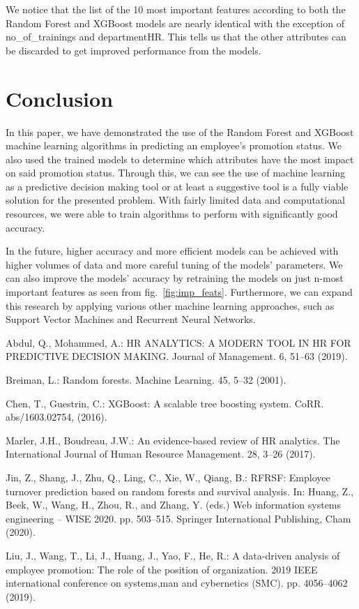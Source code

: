 \documentclass[runningheads]{llncs}
\begin{document}
\newpage

We notice that the list of the 10 most important features according to
both the Random Forest and XGBoost models are nearly identical with the
exception of no\_of\_trainings and departmentHR. This tells us that the
other attributes can be discarded to get improved performance from the
models.

\hypertarget{conclusion}{%
\section{Conclusion}\label{conclusion}}

In this paper, we have demonstrated the use of the Random Forest and
XGBoost machine learning algorithms in predicting an employee's
promotion status. We also used the trained models to determine which
attributes have the most impact on said promotion status. Through this,
we can see the use of machine learning as a predictive decision making
tool or at least a suggestive tool is a fully viable solution for the
presented problem. With fairly limited data and computational resources,
we were able to train algorithms to perform with significantly good
accuracy.

In the future, higher accuracy and more efficient models can be achieved
with higher volumes of data and more careful tuning of the models'
parameters. We can also improve the models' accuracy by retraining the
models on just n-most important features as seen from
fig.~\ref{fig:imp_feats}. Furthermore, we can expand this research by
applying various other machine learning approaches, such as Support
Vector Machines and Recurrent Neural Networks.

\begin{thebibliography}{8}
%
{Abdul, Q., Mohammed, A.: HR ANALYTICS: A MODERN TOOL IN
HR FOR PREDICTIVE DECISION MAKING. Journal of Management. 6, 51--63
(2019).}

%
{Breiman, L.: Random forests. Machine Learning. 45, 5--32
(2001).}

%
{Chen, T., Guestrin, C.: XGBoost: {A} scalable tree
boosting system. CoRR. abs/1603.02754, (2016).}

%
{Marler, J.H., Boudreau, J.W.: An evidence-based review
of HR analytics. The International Journal of Human Resource Management.
28, 3--26 (2017).}

%
{Jin, Z., Shang, J., Zhu, Q., Ling, C., Xie, W., Qiang,
B.: RFRSF: Employee turnover prediction based on random forests and
survival analysis. In: Huang, Z., Beek, W., Wang, H., Zhou, R., and
Zhang, Y. (eds.) Web information systems engineering -- WISE 2020. pp.
503--515. Springer International Publishing, Cham (2020).}

%
{Liu, J., Wang, T., Li, J., Huang, J., Yao, F., He, R.: A
data-driven analysis of employee promotion: The role of the position of
organization. 2019 IEEE international conference on systems,man and
cybernetics (SMC). pp. 4056--4062 (2019).}

\end{thebibliography}
\end{document}
